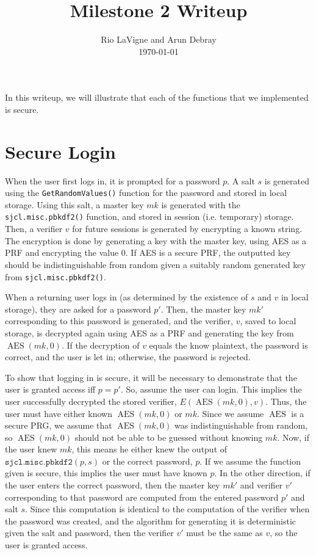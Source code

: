 \documentclass{amsart}
\DeclareMathOperator{\AES}{AES}
\begin{document}
\title{Milestone 2 Writeup}
\author{Rio LaVigne and Arun Debray\\\today}
\maketitle
In this writeup, we will illustrate that each of the functions that we implemented is secure.
\section{Secure Login}
\label{securelogin}
When the user first logs in, it is prompted for a password $p$. A salt $s$ is generated using the \verb+GetRandomValues()+ function for the password and stored in local storage. Using this salt, a master key $mk$ is generated with the \verb+sjcl.misc.pbkdf2()+ function, and stored in session (i.e. temporary) storage. Then, a verifier $v$ for future sessions is generated by encrypting a known string. The encryption is done by generating a key with the master key, using AES as a PRF and encrypting the value 0. If AES is a secure PRF, the outputted key should be indistinguishable from random given a suitably random generated key from  \verb+sjcl.misc.pbkdf2()+.

When a returning user logs in (as determined by the existence of $s$ and $v$ in local storage), they are asked for a password $p'$. Then, the master key $mk'$ corresponding to this password is generated, and the verifier, $v$, saved to local storage, is decrypted again using AES as a PRF and generating the key from $\AES(mk, 0)$. If the decryption of $v$ equals the know plaintext, the password is correct, and the user is let in; otherwise, the password is rejected.

To show that logging in is secure, it will be necessary to demonstrate that the user is granted access iff $p = p'$. So, assume the user can login. This implies the user successfully decrypted the stored verifier, $E(\AES(mk, 0), v)$. Thus, the user must have either known $\AES(mk, 0)$ or $mk$. Since we assume $\AES$ is a secure PRG, we assume that $\AES(mk, 0)$ was indistinguishable from random, so $\AES(mk, 0)$ should not be able to be guessed without knowing $mk$. Now, if the user knew $mk$, this means he either knew the output of $\mathtt{sjcl.misc.pbkdf2}(p, s)$ or the correct password, $p$. If we assume the function given is secure, this implies the user must have known $p$. In the other direction, if the user enters the correct password, then the master key $mk'$ and verifier $v'$ corresponding to that password are computed from the entered password $p'$ and salt $s$. Since this computation is identical to the computation of the verifier when the password was created, and the algorithm for generating it is deterministic given the salt and password, then the verifier $v'$ must be the same as $v$, so the user is granted access.
\end{document}
